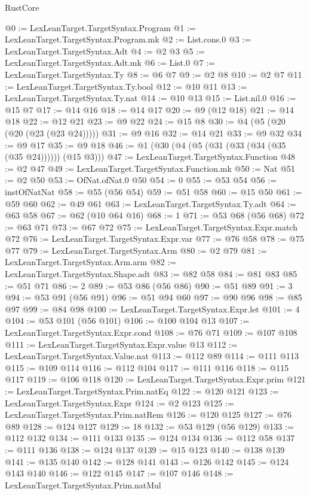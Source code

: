 \begin{lexlean}{RustCore}
\begin{coremodule}
@0 := LexLeanTarget.TargetSyntax.Program
@1 := LexLeanTarget.TargetSyntax.Program.mk
@2 := List.cons.{0}
@3 := LexLeanTarget.TargetSyntax.Adt
@4 := @2 @3
@5 := LexLeanTarget.TargetSyntax.Adt.mk
@6 := List.{0}
@7 := LexLeanTarget.TargetSyntax.Ty
@8 := @6 @7
@9 := @2 @8
@10 := @2 @7
@11 := LexLeanTarget.TargetSyntax.Ty.bool
@12 := @10 @11
@13 := LexLeanTarget.TargetSyntax.Ty.nat
@14 := @10 @13
@15 := List.nil.{0}
@16 := @15 @7
@17 := @14 @16
@18 := @14 @17
@20 := @9 (@12 @18)
@21 := @14 @18
@22 := @12 @21
@23 := @9 @22
@24 := @15 @8
@30 := @4 (@5 (@20 (@20 (@23 (@23 @24)))))
@31 := @9 @16
@32 := @14 @21
@33 := @9 @32
@34 := @9 @17
@35 := @9 @18
@46 := @1 (@30 (@4 (@5 (@31 (@33 (@34 (@35 (@35 @24)))))) (@15 @3)))
@47 := LexLeanTarget.TargetSyntax.Function
@48 := @2 @47
@49 := LexLeanTarget.TargetSyntax.Function.mk
@50 := Nat
@51 := @2 @50
@53 := OfNat.ofNat.{0} @50
@54 := 0
@55 := @53 @54
@56 := instOfNatNat
@58 := @55 (@56 @54)
@59 := @51 @58
@60 := @15 @50
@61 := @59 @60
@62 := @49 @61
@63 := LexLeanTarget.TargetSyntax.Ty.adt
@64 := @63 @58
@67 := @62 (@10 @64 @16)
@68 := 1
@71 := @53 @68 (@56 @68)
@72 := @63 @71
@73 := @67 @72
@75 := LexLeanTarget.TargetSyntax.Expr.match @72
@76 := LexLeanTarget.TargetSyntax.Expr.var
@77 := @76 @58
@78 := @75 @77
@79 := LexLeanTarget.TargetSyntax.Arm
@80 := @2 @79
@81 := LexLeanTarget.TargetSyntax.Arm.arm
@82 := LexLeanTarget.TargetSyntax.Shape.adt
@83 := @82 @58
@84 := @81 @83
@85 := @51 @71
@86 := 2
@89 := @53 @86 (@56 @86)
@90 := @51 @89
@91 := 3
@94 := @53 @91 (@56 @91)
@96 := @51 @94 @60
@97 := @90 @96
@98 := @85 @97
@99 := @84 @98
@100 := LexLeanTarget.TargetSyntax.Expr.let
@101 := 4
@104 := @53 @101 (@56 @101)
@106 := @100 @104 @13
@107 := LexLeanTarget.TargetSyntax.Expr.cond
@108 := @76 @71
@109 := @107 @108
@111 := LexLeanTarget.TargetSyntax.Expr.value @13
@112 := LexLeanTarget.TargetSyntax.Value.nat
@113 := @112 @89
@114 := @111 @113
@115 := @109 @114
@116 := @112 @104
@117 := @111 @116
@118 := @115 @117
@119 := @106 @118
@120 := LexLeanTarget.TargetSyntax.Expr.prim
@121 := LexLeanTarget.TargetSyntax.Prim.natEq
@122 := @120 @121
@123 := LexLeanTarget.TargetSyntax.Expr
@124 := @2 @123
@125 := LexLeanTarget.TargetSyntax.Prim.natRem
@126 := @120 @125
@127 := @76 @89
@128 := @124 @127
@129 := 18
@132 := @53 @129 (@56 @129)
@133 := @112 @132
@134 := @111 @133
@135 := @124 @134
@136 := @112 @58
@137 := @111 @136
@138 := @124 @137
@139 := @15 @123
@140 := @138 @139
@141 := @135 @140
@142 := @128 @141
@143 := @126 @142
@145 := @124 @143 @140
@146 := @122 @145
@147 := @107 @146
@148 := LexLeanTarget.TargetSyntax.Prim.natMul

\end{coremodule}
\end{lexlean}

